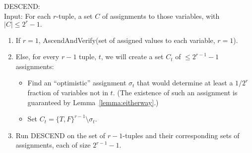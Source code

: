 \documentclass[final,12pt]{colt2018}
\begin{document}
\begin{algorithm}[H]
DESCEND:\\
Input: For each $r$-tuple, a set $C$ of assignments to those variables, with $|C| \le 2^r -1.$
\begin{enumerate}
\vspace{-.2cm}\item If $r=1$, AscendAndVerify(set of assigned values to each variable, $r=1$).
\vspace{-.2cm}\item Else, for every $r-1$ tuple, $t$, we will create a set $C_t$ of $\le 2^{r-1}-1$ assignments:
\begin{itemize}
\vspace{-.2cm}\item Find an ``optimistic'' assignment $\sigma_t$ that would determine at least a $1/2^r$ fraction of variables not in $t$.  (The existence of such an assignment is guaranteed by Lemma~\ref{lemma:eitherway}.)
\item Set $C_t = \{T,F\}^{r-1} \setminus \sigma_t.$
\end{itemize}
\item Run DESCEND on the set of $r-1$-tuples and their corresponding sets of assignments, each of size $2^{r-1}-1$.
\end{enumerate}
\end{algorithm}
\end{document}
